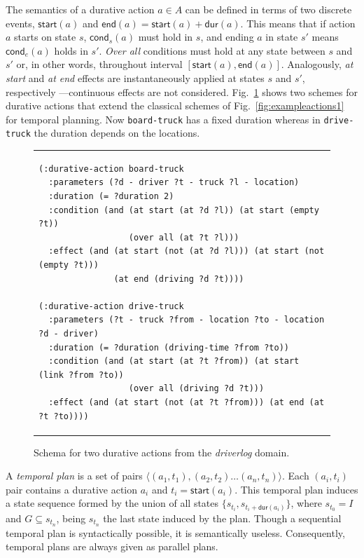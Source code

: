 \documentclass[runningheads]{llncs}
\newcommand{\tup}[1]{{\langle #1 \rangle}}
\newcommand{\cond}{\mathsf{cond}}  %
\newcommand{\dur}{\mathsf{dur}}    %
\newcommand{\start}{\mathsf{start}}%
\newcommand{\en}{\mathsf{end}}     %
\newcommand{\til}{\mathsf{til}}    %
\begin{document}
The semantics of a durative action $a\in A$ can be defined in terms of two discrete events, $\start(a)$ and $\en(a)=\start(a)+\dur(a)$. This means that if action $a$ starts on state $s$, $\cond_s(a)$ must hold in $s$, and ending $a$ in state $s'$ means $\cond_e(a)$ holds in $s'$. {\em Over all} conditions must hold at any state between $s$ and $s'$ or, in other words, throughout interval $[\start(a),\en(a)]$.
Analogously, {\em at start} and {\em at end} effects are instantaneously applied at states $s$ and $s'$, respectively ---continuous effects are not considered.
Fig.~\ref{fig:exampleactions2} shows two schemes for durative actions that extend the classical schemes of Fig.~\ref{fig:exampleactions1} for temporal planning. Now \texttt{board-truck} has a fixed duration whereas in \texttt{drive-truck} the duration depends on the locations.

\begin{figure}
\begin{tabular}{p{\textwidth}}
\begin{verbatim}
(:durative-action board-truck
  :parameters (?d - driver ?t - truck ?l - location)
  :duration (= ?duration 2)
  :condition (and (at start (at ?d ?l)) (at start (empty ?t))
                  (over all (at ?t ?l)))
  :effect (and (at start (not (at ?d ?l))) (at start (not (empty ?t)))
               (at end (driving ?d ?t))))

(:durative-action drive-truck
  :parameters (?t - truck ?from - location ?to - location ?d - driver)
  :duration (= ?duration (driving-time ?from ?to))
  :condition (and (at start (at ?t ?from)) (at start (link ?from ?to))
                  (over all (driving ?d ?t)))
  :effect (and (at start (not (at ?t ?from))) (at end (at ?t ?to))))
\end{verbatim}
\end{tabular}
\caption{\small Schema for two durative actions from the {\em driverlog} domain.}
\label{fig:exampleactions2}
\end{figure}


A {\em temporal plan} is a set of pairs $\tup{(a_1,t_1),(a_2,t_2)\ldots (a_n,t_n)}$. Each $(a_i,t_i)$ pair contains a durative action $a_i$ and $t_i=\start(a_i)$.
This temporal plan induces a state sequence formed by the union of all states $\{s_{t_i}, s_{t_i+\dur(a_i)}\}$, where $s_{t_0}=I$ and $G\subseteq s_{t_n}$, being $s_{t_n}$ the last state induced by the plan.
Though a sequential temporal plan is syntactically possible, it is semantically useless. Consequently, temporal plans are always given as parallel plans.
\end{document}
